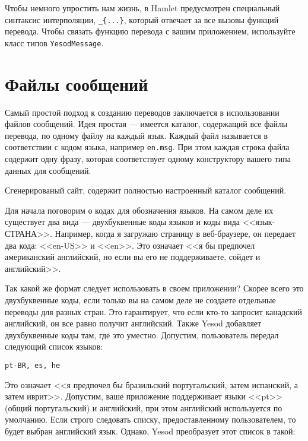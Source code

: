 Чтобы немного упростить нам жизнь, в Hamlet предусмотрен специальный синтаксис интерполяции, \lstinline'_{...}', который отвечает за все вызовы функций перевода. Чтобы связать функцию перевода с вашим приложением, используйте класс типов \lstinline'YesodMessage'.

\section{Файлы сообщений} %

Самый простой подход к созданию переводов заключается в использовании файлов сообщений. Идея простая --- имеется каталог, содержащий все файлы перевода, по одному файлу на каждый язык. Каждый файл называется в соответствии с кодом языка, например \lstinline'en.msg'. При этом каждая строка файла содержит одну фразу, которая соответствует одному конструктору вашего типа данных для сообщений.

\begin{remark}
Сгенерированый сайт, содержит полностью настроенный каталог сообщений. %
\end{remark}

Для начала поговорим о кодах для обозначения языков. На самом деле их существует два вида --- двухбуквенные коды языков и коды вида <<язык-СТРАНА>>. Например, когда я загружаю страницу в веб-браузере, он передает два кода: <<en-US>> и <<en>>. Это означает <<я бы предпочел американский английский, но если вы его не поддерживаете, сойдет и английский>>.

Так какой же формат следует использовать в своем приложении? Скорее всего это двухбуквенные коды, если только вы на самом деле не создаете отдельные переводы для разных стран. Это гарантирует, что если кто-то запросит канадский английский, он все равно получит английский. Также Yesod добавляет двухбуквенные коды там, где это уместно. Допустим, пользователь передал следующий список языков:

\begin{lstlisting}
pt-BR, es, he
\end{lstlisting}

Это означает <<я предпочел бы бразильский португальский, затем испанский, а затем иврит>>. Допустим, ваше приложение поддерживает языки <<pt>> (общий португальский) и английский, при этом английский используется по умолчанию. Если строго следовать списку, предоставленному пользователем, то будет выбран английский язык. Однако, Yesod преобразует этот список в такой:

